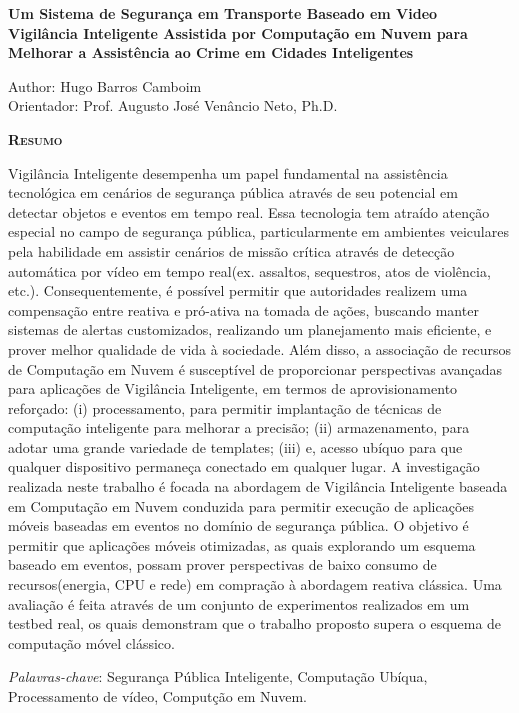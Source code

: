 \begin{center}
	{\Large{\textbf{Um Sistema de Segurança em Transporte Baseado em Video Vigilância Inteligente Assistida por Computação em Nuvem para Melhorar a Assistência ao Crime em Cidades Inteligentes}}}          
\end{center}

\vspace{0.5cm}

\begin{flushright}
	Author: Hugo Barros Camboim\\
	Orientador: Prof. Augusto José Venâncio Neto, Ph.D.
\end{flushright}

\vspace{0.5cm}

\begin{center}
	\Large{\textsc{\textbf{Resumo}}}
\end{center}

\noindent Vigilância Inteligente desempenha um papel fundamental na assistência tecnológica em cenários de segurança pública através de seu potencial em detectar objetos e eventos em tempo real. Essa tecnologia tem atraído atenção especial no campo de segurança pública, particularmente em ambientes veiculares pela habilidade em assistir cenários de missão crítica através de detecção automática por vídeo em tempo real(ex. assaltos, sequestros, atos de violência, etc.). Consequentemente, é possível permitir que autoridades realizem uma compensação entre reativa e pró-ativa na tomada de ações, buscando manter sistemas de alertas customizados, realizando um planejamento mais eficiente, e prover melhor qualidade de vida à sociedade. Além disso, a associação de recursos de Computação em Nuvem é susceptível de proporcionar perspectivas avançadas para aplicações de Vigilância Inteligente, em termos de aprovisionamento reforçado: (i) processamento, para permitir implantação de técnicas de computação inteligente para melhorar a precisão; (ii) armazenamento, para adotar uma grande variedade de templates; (iii) e, acesso ubíquo para que qualquer dispositivo permaneça conectado em qualquer lugar. A investigação realizada neste trabalho é focada na abordagem de Vigilância Inteligente baseada em Computação em Nuvem conduzida para permitir execução de aplicações móveis baseadas em eventos no domínio de segurança pública. O objetivo é permitir que aplicações móveis otimizadas, as quais explorando um esquema baseado em eventos, possam prover perspectivas de baixo consumo de recursos(energia, CPU e rede) em compração à abordagem reativa clássica. Uma avaliação é feita através de um conjunto de experimentos realizados em um testbed real, os quais demonstram que o trabalho proposto supera o esquema de computação móvel clássico.

\noindent\textit{Palavras-chave}: Segurança Pública Inteligente, Computação Ubíqua, Processamento de vídeo, Computção em Nuvem.
